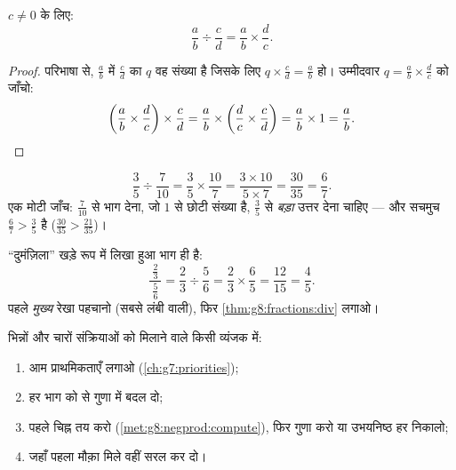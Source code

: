 \begin{theorem}[भाग देना यानी व्युत्क्रम से गुणा करना]\label{thm:g8:fractions:div}
$c \neq 0$ के लिए:
\[
\frac{a}{b} \div \frac{c}{d} = \frac{a}{b} \times \frac{d}{c} .
\]
\end{theorem}

\begin{proof}
परिभाषा से, $\frac ab$ में $\frac cd$ का  $q$ वह संख्या है
जिसके लिए $q \times \frac cd = \frac ab$ हो। उम्मीदवार
$q = \frac ab \times \frac dc$ को जाँचो:
\[
\left(\frac ab \times \frac dc\right) \times \frac cd
= \frac ab \times \left(\frac dc \times \frac cd\right)
= \frac ab \times 1 = \frac ab . \qedhere
\]
\end{proof}

\begin{example}\label{ex:g8:fractions:div}
\[
\frac{3}{5} \div \frac{7}{10}
= \frac{3}{5} \times \frac{10}{7}
= \frac{3 \times 10}{5 \times 7}
= \frac{30}{35} = \frac{6}{7}.
\]
एक मोटी जाँच: $\frac{7}{10}$ से भाग देना, जो $1$ से छोटी संख्या है,
$\frac35$ से \emph{बड़ा} उत्तर देना चाहिए --- और सचमुच
$\frac67 > \frac35$ है ($\frac{30}{35} > \frac{21}{35}$)।
\end{example}

\begin{example}[भिन्न की रेखा के भीतर भिन्न की रेखा]\label{ex:g8:fractions:complex}
``दुमंज़िला''  खड़े रूप में लिखा हुआ भाग ही है:
\[
\frac{\ \frac{2}{3}\ }{\ \frac{5}{6}\ }
= \frac{2}{3} \div \frac{5}{6}
= \frac{2}{3} \times \frac{6}{5}
= \frac{12}{15} = \frac{4}{5}.
\]
पहले \emph{मुख्य} रेखा पहचानो (सबसे लंबी वाली), फिर
\cref{thm:g8:fractions:div} लगाओ।
\end{example}

\begin{method}[मिली-जुली गणनाएँ]\label{met:g8:fractions:mixed}
भिन्नों और चारों संक्रियाओं को मिलाने वाले किसी व्यंजक में:
\begin{enumerate}
  \item आम प्राथमिकताएँ लगाओ (\cref{ch:g7:priorities});
  \item हर भाग को  से गुणा में बदल दो;
  \item पहले चिह्न तय करो (\cref{met:g8:negprod:compute}), फिर गुणा
        करो या उभयनिष्ठ हर निकालो;
  \item जहाँ पहला मौक़ा मिले वहीं सरल कर दो।
\end{enumerate}
\end{method}

